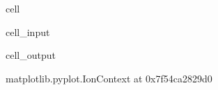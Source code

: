 \documentclass[letterpaper,10pt,english]{jupyterBook}
\begin{document}
\begin{sphinxuseclass}{cell}\begin{sphinxVerbatimInput}

\begin{sphinxuseclass}{cell_input}
\begin{sphinxVerbatim}[commandchars=\\\{\}]
    
   
   
\end{sphinxVerbatim}

\end{sphinxuseclass}\end{sphinxVerbatimInput}
\begin{sphinxVerbatimOutput}

\begin{sphinxuseclass}{cell_output}
\begin{sphinxVerbatim}[commandchars=\\\{\}]
\PYGZlt{}matplotlib.pyplot.\PYGZus{}IonContext at 0x7f54ca2829d0\PYGZgt{}
\end{sphinxVerbatim}

\end{sphinxuseclass}\end{sphinxVerbatimOutput}

\end{sphinxuseclass}
\end{document}

